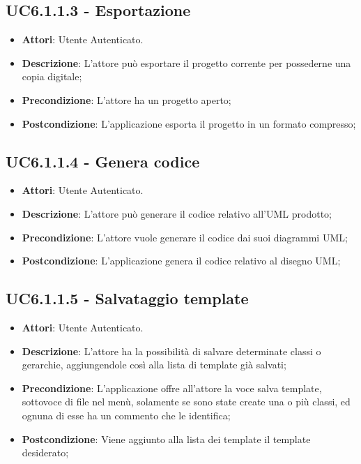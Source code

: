 \subsection{UC6.1.1.3 - Esportazione} 
\label{ssec:UC6.1.1.3} 
\begin{itemize} 
\item \textbf{Attori}: Utente Autenticato.
\item \textbf{Descrizione}: L’attore può esportare il progetto corrente per possederne una copia digitale;
\item \textbf{Precondizione}: L’attore ha un progetto aperto;
\item \textbf{Postcondizione}: L’applicazione esporta il progetto in un formato compresso;
\end{itemize} 
\subsection{UC6.1.1.4 - Genera codice} 
\label{ssec:UC6.1.1.4} 
\begin{itemize} 
\item \textbf{Attori}: Utente Autenticato.
\item \textbf{Descrizione}: L’attore può generare il codice relativo all’UML prodotto;
\item \textbf{Precondizione}: L’attore vuole generare il codice dai suoi diagrammi UML;
\item \textbf{Postcondizione}: L’applicazione genera il codice relativo al disegno UML;
\end{itemize} 
\subsection{UC6.1.1.5 - Salvataggio template} 
\label{ssec:UC6.1.1.5} 
\begin{itemize} 
\item \textbf{Attori}: Utente Autenticato.
\item \textbf{Descrizione}: L’attore ha la possibilità di salvare determinate classi o gerarchie, aggiungendole così alla lista di template già salvati;
\item \textbf{Precondizione}: L’applicazione offre all’attore la voce salva template, sottovoce di file nel menù, solamente se sono state create una o più classi, ed ognuna di esse ha un commento che le identifica;
\item \textbf{Postcondizione}: Viene aggiunto alla lista dei template il template desiderato;
\end{itemize} 

